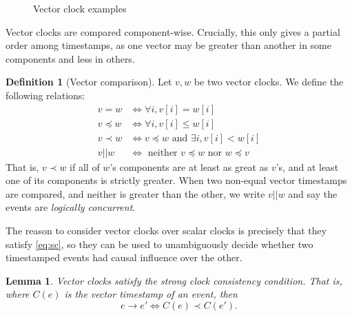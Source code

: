 \documentclass[]             %
{NASA}                       %
\newtheorem{lemma}[theorem]{Lemma}
\theoremstyle{definition}
\newtheorem{definition}{Definition}[section]
\begin{document}
\begin{figure}[p]
  \setlength\belowcaptionskip{5ex}

  \begin{subfigure}{1\textwidth}
    \centering
    
    \label{fig:message-latencies-vector-a}
  \end{subfigure}

  \vspace{4ex}

  \begin{subfigure}{1\textwidth}
    \centering 
    \label{fig:message-latencies-vector-b}
  \end{subfigure}

  \begin{subfigure}{1\textwidth}
    \centering 
    \label{fig:message-latencies-vector-c}
  \end{subfigure}

  \caption{Vector clock examples}
  \label{fig:message-latencies-vector}
\end{figure}

\afterpage{\clearpage}

Vector clocks are compared component-wise. Crucially, this only gives a partial
order among timestamps, as one vector may be greater than another in
some components and less in others.
\begin{definition}[Vector comparison]
  Let $v, w$ be two vector clocks. We define the following relations:
  \begin{align*}
             v = w &\iff \forall i, v[i] = w[i] \\
  v \preccurlyeq w &\iff \forall i, v[i] \leq w[i] \\
         v \prec w &\iff v \preccurlyeq w \textrm{ and } \exists i, v[i] < w[i] \\
            v || w &\iff \textrm{ neither } v \preccurlyeq w \textrm{ nor } w \preccurlyeq v
  \end{align*}
  That is, $v \prec w$ if all of $w$'s components are at least as
  great as $v$'s, and at least one of its components is strictly
  greater. When two non-equal vector timestamps are compared, and
  neither is greater than the other, we write $v || w$ and say the
  events are \emph{logically concurrent}.
\end{definition}

The reason to consider vector clocks over scalar clocks is precisely
that they satisfy \ref{eq:sc}, so they can be used to unambiguously
decide whether two timestamped events had causal influence over the
other.
\begin{lemma}
  Vector clocks satisfy the strong clock consistency condition. That
  is, where $C(e)$ is the vector timestamp of an event, then
  \[ e \to e' \iff C(e) \prec C(e'). \]
\end{lemma}
\end{document}
